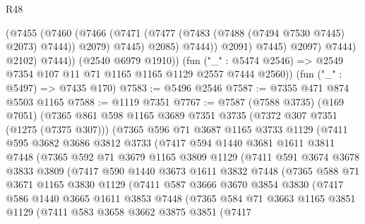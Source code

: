 \begin{lexlean}{R48}
\begin{coremodule}
                        (@7455
                          (@7460
                            (@7466
                              (@7471 (@7477 (@7483 (@7488 (@7494 @7530 @7445) @2073) @7444)) @2079)
                              @7445)
                            @2085)
                          @7444))
                      @2091)
                    @7445)
                  @2097)
                @7444)
              @2102)
            @7444))
        (@2540 @6979 @1910))
      (fun ("_" : @5474 @2546) => @2549 @7354 @107 @11 @71 @1165 @1165 @1129 @2557 @7444 @2560))
    (fun ("_" : @5497) => @7435 @170)
@7583 := @5496 @2546
@7587 := @7355 @471 @874 @5503 @1165
@7588 := @1119 @7351
@7767 := @7587
    (@7588 @3735)
    (@169 @7051)
    (@7365
      @861
      @598
      @1165
      @3689
      @7351
      @3735
      (@7372 @307 @7351 (@1275 (@7375 @307)))
      (@7365
        @596
        @71
        @3687
        @1165
        @3733
        @1129
        (@7411
          @595
          @3682
          @3686
          @3812
          @3733
          (@7417
            @594
            @1440
            @3681
            @1611
            @3811
            @7448
            (@7365
              @592
              @71
              @3679
              @1165
              @3809
              @1129
              (@7411
                @591
                @3674
                @3678
                @3833
                @3809
                (@7417
                  @590
                  @1440
                  @3673
                  @1611
                  @3832
                  @7448
                  (@7365
                    @588
                    @71
                    @3671
                    @1165
                    @3830
                    @1129
                    (@7411
                      @587
                      @3666
                      @3670
                      @3854
                      @3830
                      (@7417
                        @586
                        @1440
                        @3665
                        @1611
                        @3853
                        @7448
                        (@7365
                          @584
                          @71
                          @3663
                          @1165
                          @3851
                          @1129
                          (@7411
                            @583
                            @3658
                            @3662
                            @3875
                            @3851
                            (@7417

\end{coremodule}
\end{lexlean}
